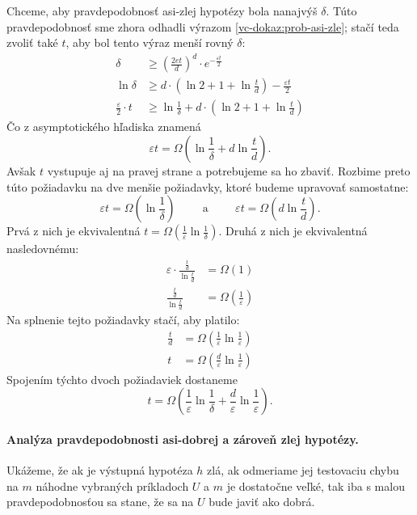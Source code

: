Chceme, aby pravdepodobnosť asi-zlej hypotézy bola nanajvýš $\delta$. Túto
pravdepodobnosť sme zhora odhadli výrazom \ref{vc-dokaz:prob-asi-zle};
stačí teda zvoliť také $t$, aby bol tento výraz menší rovný $\delta$:
\begin{align}
  \delta &\geq \left( \frac{2et}{d} \right)^d \cdot e^{-\frac{\varepsilon t}{2}}  \\
  \ln \delta &\geq d \cdot \left( \ln 2 + 1 + \ln \frac{t}{d} \right) - \frac{\varepsilon t}{2}   \\
  \frac{\varepsilon}{2} \cdot t &\geq \ln \frac{1}{\delta} + d \cdot \left( \ln 2 + 1 + \ln \frac{t}{d} \right)
\end{align}
Čo z asymptotického hľadiska znamená
$$ \varepsilon t = \Omega \left( \ln \frac{1}{\delta} + d \ln \frac{t}{d} \right). $$
Avšak $t$ vystupuje aj na pravej strane a potrebujeme sa ho zbaviť. Rozbime
preto túto požiadavku na dve menšie požiadavky, ktoré budeme upravovať
samostatne:
$$ \varepsilon t = \Omega \left( \ln \frac{1}{\delta} \right) \hspace{1cm} \text{a} \hspace{1cm} \varepsilon t = \Omega \left( d \ln \frac{t}{d} \right). $$
Prvá z nich je ekvivalentná $t = \Omega \left( \frac{1}{\varepsilon} \ln \frac{1}{\delta} \right)$.
Druhá z nich je ekvivalentná nasledovnému:
\begin{align}
  \varepsilon \cdot \frac{\frac{t}{d}}{\ln \frac{t}{d}} &= \Omega(1)    \\
  \frac{\frac{t}{d}}{\ln \frac{t}{d}} &= \Omega \left( \frac{1}{\varepsilon} \right)
\end{align}
Na splnenie tejto požiadavky stačí, aby platilo:
\begin{align}
  \frac{t}{d} &= \Omega \left( \frac{1}{\varepsilon} \ln \frac{1}{\varepsilon} \right)    \\
  t &= \Omega \left( \frac{d}{\varepsilon} \ln \frac{1}{\varepsilon} \right)
\end{align}
Spojením týchto dvoch požiadaviek dostaneme
$$ t = \Omega \left( \frac{1}{\varepsilon} \ln \frac{1}{\delta} + \frac{d}{\varepsilon} \ln \frac{1}{\varepsilon} \right). $$


\paragraph{Analýza pravdepodobnosti asi-dobrej a zároveň zlej hypotézy.} \label{vc-dokaz:chernoff}

Ukážeme, že ak je výstupná hypotéza $h$ zlá, ak odmeriame
jej testovaciu chybu na $m$ náhodne vybraných príkladoch $U$ a $m$ je
dostatočne veľké, tak iba s malou pravdepodobnosťou sa stane, že sa na $U$
bude javiť ako dobrá.

